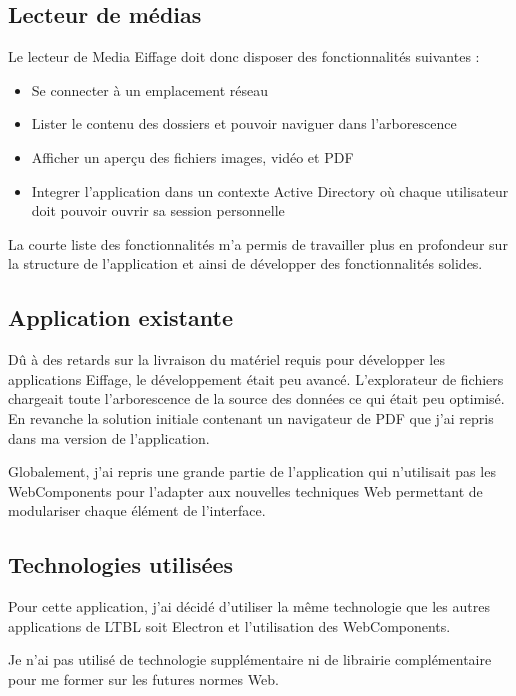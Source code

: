 \clearpage

\subsection{Lecteur de médias}

Le lecteur de Media Eiffage doit donc disposer des fonctionnalités suivantes :

\begin{itemize}
    \item Se connecter à un emplacement réseau
    \item Lister le contenu des dossiers et pouvoir naviguer dans l'arborescence
    \item Afficher un aperçu des fichiers images, vidéo et PDF
    \item Integrer l'application dans un contexte Active Directory où chaque utilisateur doit pouvoir ouvrir sa session personnelle
\end{itemize}

La courte liste des fonctionnalités m'a permis de travailler plus en profondeur sur la structure de l'application et ainsi de développer des fonctionnalités solides.

\subsection{Application existante}

Dû à des retards sur la livraison du matériel requis pour développer les applications Eiffage, le développement était peu avancé.
L'explorateur de fichiers chargeait toute l'arborescence de la source des données ce qui était peu optimisé.
En revanche la solution initiale contenant un navigateur de PDF que j'ai repris dans ma version de l'application.

Globalement, j'ai repris une grande partie de l'application qui n'utilisait pas les WebComponents pour l'adapter aux nouvelles techniques Web permettant de modulariser chaque élément de l'interface.

\subsection{Technologies utilisées}

Pour cette application, j'ai décidé d'utiliser la même technologie que les autres applications de LTBL soit Electron et l'utilisation des WebComponents.

Je n'ai pas utilisé de technologie supplémentaire ni de librairie complémentaire pour me former sur les futures normes Web.

